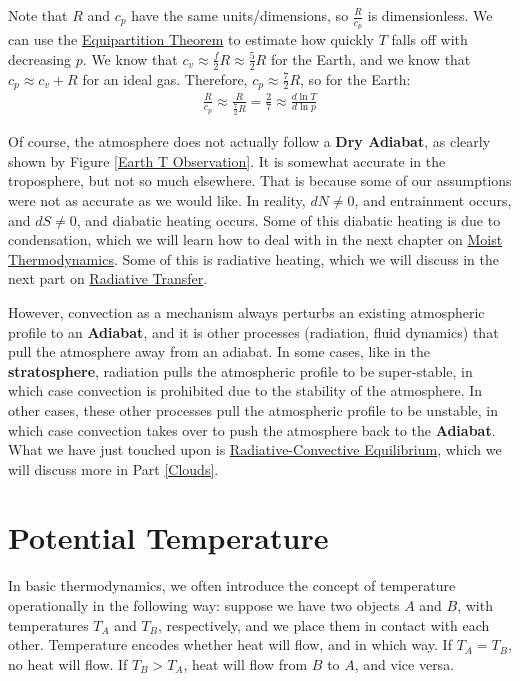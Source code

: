 Note that $R$ and $c_p$ have the same units/dimensions, so $\frac{R}{c_p}$ is dimensionless. We can use the \hyperref[Equipartition]{Equipartition Theorem} to estimate how quickly $T$ falls off with decreasing $p$. We know that $c_v\approx \frac{f}{2}R\approx\frac{5}{2}R$ for the Earth, and we know that $c_p\approx c_v+R$ for an ideal gas. Therefore, $c_p\approx \frac{7}{2}R$, so for the Earth:
\begin{align*}
    \frac{R}{c_p}\approx\frac{R}{\frac{7}{2}R}=\frac{2}{7}\approx\frac{d \ln T}{d \ln p}
\end{align*}

Of course, the atmosphere does not actually follow a \textbf{Dry Adiabat}, as clearly shown by Figure \ref{Earth T Observation}. It is somewhat accurate in the troposphere, but not so much elsewhere. That is because some of our assumptions were not as accurate as we would like. In reality, $dN\neq0$, and entrainment occurs, and $dS\neq0$, and diabatic heating occurs. Some of this diabatic heating is due to condensation, which we will learn how to deal with in the next chapter on \hyperref[Moist Thermodynamics]{Moist Thermodynamics}. Some of this is radiative heating, which we will discuss in the next part on \hyperref[Radiative Transfer]{Radiative Transfer}.

However, convection as a mechanism always perturbs an existing atmospheric profile to an \textbf{Adiabat}, and it is other processes (radiation, fluid dynamics) that pull the atmosphere away from an adiabat. In some cases, like in the \textbf{stratosphere}, radiation pulls the atmospheric profile to be super-stable, in which case convection is prohibited due to the stability of the atmosphere. In other cases, these other processes pull the atmospheric profile to be unstable, in which case convection takes over to push the atmosphere back to the \textbf{Adiabat}. What we have just touched upon is \hyperref[Radiative-Convective Equilibrium]{Radiative-Convective Equilibrium}, which we will discuss more in Part \ref{Clouds}.

\section{Potential Temperature}

In basic thermodynamics, we often introduce the concept of temperature operationally in the following way: suppose we have two objects $A$ and $B$, with temperatures $T_A$ and $T_B$, respectively, and we place them in contact with each other. Temperature encodes whether heat will flow, and in which way. If $T_A=T_B$, no heat will flow. If $T_B>T_A$, heat will flow from $B$ to $A$, and vice versa.

